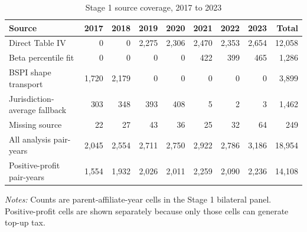 \begin{table}[H]
\centering
\small
\setlength{\tabcolsep}{4pt}
\caption[Stage 1 source coverage]{Stage 1 source coverage, 2017 to 2023}
\label{tab:stage1_source_updated}
\begin{tabular}{@{}lrrrrrrrr@{}}
\toprule
Source & 2017 & 2018 & 2019 & 2020 & 2021 & 2022 & 2023 & Total \\
\midrule
Direct Table IV &     0 &     0 & 2,275 & 2,306 & 2,470 & 2,353 & 2,654 & 12,058 \\
Beta percentile fit &     0 &     0 &     0 &     0 &   422 &   399 &   465 &  1,286 \\
BSPI shape transport & 1,720 & 2,179 &     0 &     0 &     0 &     0 &     0 &  3,899 \\
Jurisdiction-average fallback &   303 &   348 &   393 &   408 &     5 &     2 &     3 &  1,462 \\
Missing source &    22 &    27 &    43 &    36 &    25 &    32 &    64 &    249 \\
All analysis pair-years & 2,045 & 2,554 & 2,711 & 2,750 & 2,922 & 2,786 & 3,186 & 18,954 \\
Positive-profit pair-years & 1,554 & 1,932 & 2,026 & 2,011 & 2,259 & 2,090 & 2,236 & 14,108 \\
\bottomrule
\end{tabular}

\vspace{0.35em}
\noindent\begin{minipage}{\textwidth}
\footnotesize\raggedright\textit{Notes:} Counts are parent-affiliate-year cells in the Stage 1 bilateral panel. Positive-profit cells are shown separately because only those cells can generate top-up tax.
\end{minipage}
\end{table}
